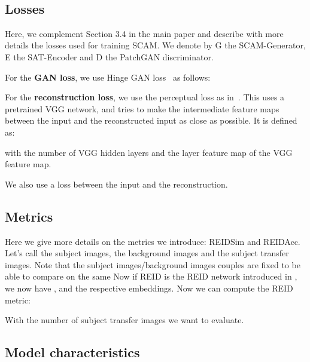 \documentclass[runningheads]{llncs}
\makeatletter
\newcommand{\mname}{SCAM\@\xspace}
\makeatother
\begin{document}
\begin{algorithm}
\caption{SCAM-Block at layer j}\label{alg:scam_block}
\KwData{;; ;}
\KwResult{;; }
\;
\;
\;
\;
\;
\
\end{algorithm}

\subsection{Losses}

Here, we complement Section 3.4 in the main paper and describe with more details the losses used for training \mname. We denote by G the SCAM-Generator, E the SAT-Encoder and D the PatchGAN discriminator.

\noindent For the\textbf{ GAN loss}, we use Hinge GAN loss~\cite{lim2017geometric} as follows: 


\noindent For the \textbf{reconstruction loss}, we use the perceptual loss as in~\cite{Zhu_2020}. This uses a pretrained VGG network, and tries to make the intermediate feature maps between the input and the reconstructed input as close as possible. It is defined as:

\noindent with  the number of VGG hidden layers and  the  layer feature map of the VGG feature map.


We also use a  loss between the input and the reconstruction.


\subsection{Metrics}
Here we give more details on the metrics we introduce: REIDSim and REIDAcc. Let's call  the subject images,  the background images and  the subject transfer images. Note that the subject images/background images couples are fixed to be able to compare on the same 
Now if REID is the REID network introduced in \cite{fu2021unsupervised}, we now have ,  and  the respective embeddings. Now we can compute the REID metric:



With  the number of subject transfer images we want to evaluate.

\subsection{Model characteristics} 
\end{document}

